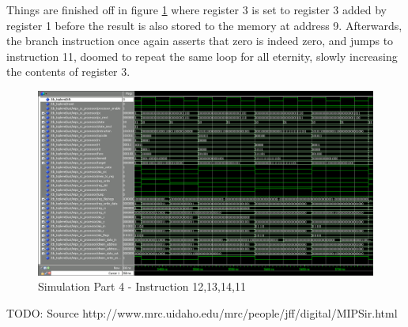 Things are finished off in figure \ref{fig:sim4} where register 3 is set to register 3 added by register 1 before the result is also stored to the memory at address 9. Afterwards, the branch instruction once again asserts that zero is indeed zero, and jumps to instruction 11, doomed to repeat the same loop for all eternity, slowly increasing the contents of register 3.

\begin{figure}[ht]
    \centering
    \includegraphics[scale=0.3]{figures/sim4.png}
    \caption{\label{fig:sim4}Simulation Part 4 - Instruction 12,13,14,11}
\end{figure}

TODO: Source
http://www.mrc.uidaho.edu/mrc/people/jff/digital/MIPSir.html
